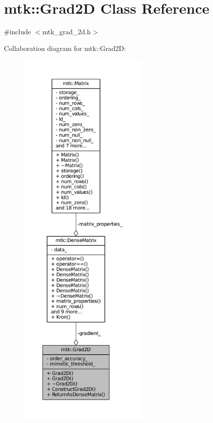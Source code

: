 \hypertarget{classmtk_1_1Grad2D}{\section{mtk\+:\+:Grad2\+D Class Reference}
\label{classmtk_1_1Grad2D}
}


{\ttfamily \#include $<$mtk\+\_\+grad\+\_\+2d.\+h$>$}



Collaboration diagram for mtk\+:\+:Grad2\+D\+:\nopagebreak
\begin{figure}[H]
\begin{center}
\leavevmode
\includegraphics[height=550pt]{classmtk_1_1Grad2D__coll__graph}
\end{center}
\end{figure}
